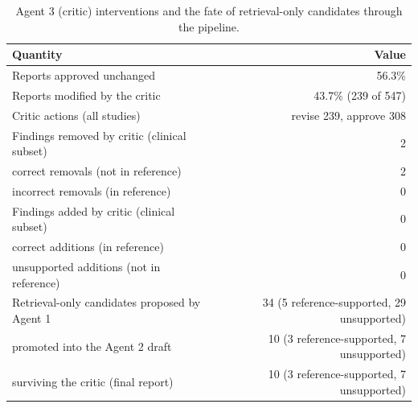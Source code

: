 \begin{table}[t]
\centering
\scriptsize
\begin{tabular}{lr}
\hline
Quantity & Value \\
\hline
Reports approved unchanged & 56.3\% \\
Reports modified by the critic & 43.7\% (239 of 547) \\
Critic actions (all studies) & revise 239, approve 308 \\
Findings removed by critic (clinical subset) & 2 \\
  correct removals (not in reference) & 2 \\
  incorrect removals (in reference) & 0 \\
Findings added by critic (clinical subset) & 0 \\
  correct additions (in reference) & 0 \\
  unsupported additions (not in reference) & 0 \\
Retrieval-only candidates proposed by Agent 1 & 34 (5 reference-supported, 29 unsupported) \\
  promoted into the Agent 2 draft & 10 (3 reference-supported, 7 unsupported) \\
  surviving the critic (final report) & 10 (3 reference-supported, 7 unsupported) \\
\hline
\end{tabular}
\caption{Agent 3 (critic) interventions and the fate of retrieval-only candidates through the pipeline.}
\label{tab:table5_agent3_intervention_analysis}
\end{table}
